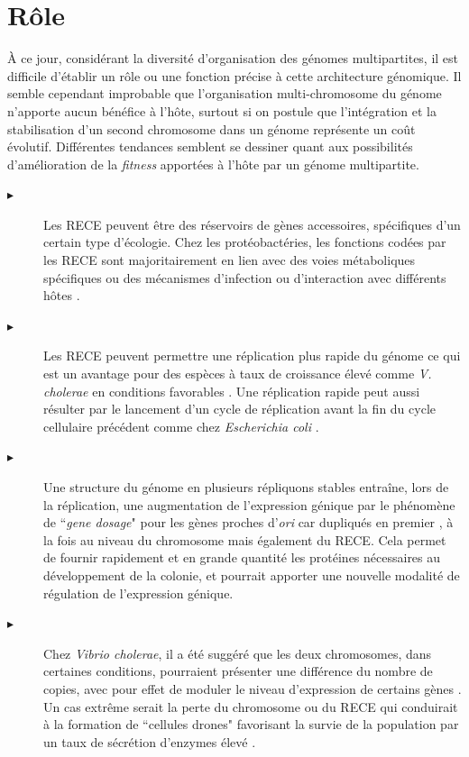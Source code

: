 	
 \section{Rôle}\label{chrIIfunc}
	À ce jour, considérant la diversité d'organisation des génomes multipartites, il est difficile d'établir un rôle ou une fonction précise à cette architecture génomique. Il semble cependant improbable que l'organisation multi-chromosome du génome n'apporte aucun bénéfice à l'hôte, surtout si on postule que l'intégration et la stabilisation d'un second chromosome dans un génome représente un coût évolutif. Différentes tendances semblent se dessiner quant aux possibilités d'amélioration de la \textit{fitness} apportées à l'hôte par un génome multipartite. 
\begin{description}
	\item[$\blacktriangleright$]  Les RECE peuvent être des réservoirs de gènes accessoires, spécifiques d'un certain type d'écologie. Chez les  protéobactéries, les fonctions codées par les RECE sont majoritairement en lien avec des voies métaboliques spécifiques ou des mécanismes d'infection ou d'interaction avec différents hôtes \citep{galardini2013replicon}.
	\item[$\blacktriangleright$] Les RECE peuvent permettre une réplication plus rapide du génome ce qui est un avantage pour des espèces à taux de croissance élevé comme \textit{V. cholerae} en conditions favorables \citep{Yamaichi1999}. Une réplication rapide peut aussi résulter par le lancement d'un cycle de réplication avant la fin du cycle cellulaire précédent \citep{stokke2011replication} comme chez \textit{Escherichia coli} \citep{skarstad1986timing}.
	\item[$\blacktriangleright$] Une structure du génome en plusieurs répliquons stables entraîne, lors de la réplication, une augmentation de l'expression génique par le phénomène de ``\textit{gene dosage}" pour les gènes proches d'\textit{ori} car dupliqués en premier  \citep{Jha2012}, à la fois au niveau du chromosome mais également du RECE. Cela permet de fournir rapidement et en grande quantité les protéines nécessaires au développement de la colonie, et pourrait apporter une nouvelle modalité de régulation de l'expression génique. 
	\item[$\blacktriangleright$] Chez \textit{Vibrio cholerae}, il a été suggéré que les deux chromosomes, dans certaines conditions, pourraient présenter une différence du nombre de copies, avec pour effet de moduler le niveau d'expression de certains gènes \citep{Heidelberg2000}. Un cas extrême serait la perte du chromosome ou du RECE qui conduirait à la formation de ``cellules drones" favorisant la survie de la population par un taux de sécrétion d'enzymes élevé \citep{Jha2012}.

\end{description}
